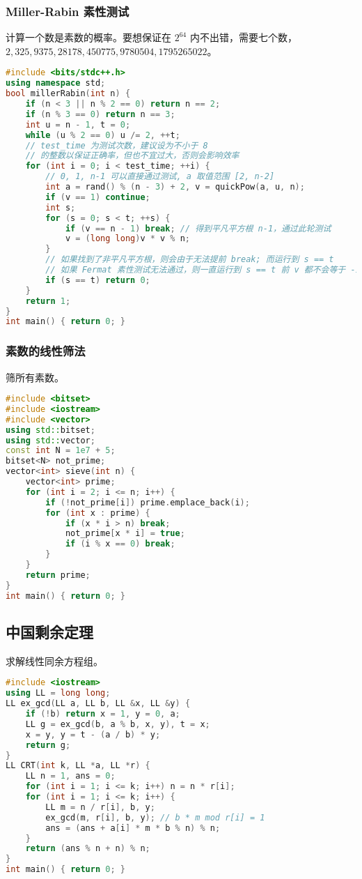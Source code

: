 \documentclass[9pt, a4paper, oneside]{book}
\begin{document}
\subsubsection{Miller-Rabin 素性测试}
计算一个数是素数的概率。要想保证在 $2^64$ 内不出错，需要七个数，$2,325,9375,28178,450775,9780504,1795265022$。
\begin{lstlisting}[language={C++}]
#include <bits/stdc++.h>
using namespace std;
bool millerRabin(int n) {
    if (n < 3 || n % 2 == 0) return n == 2;
    if (n % 3 == 0) return n == 3;
    int u = n - 1, t = 0;
    while (u % 2 == 0) u /= 2, ++t;
    // test_time 为测试次数，建议设为不小于 8
    // 的整数以保证正确率，但也不宜过大，否则会影响效率
    for (int i = 0; i < test_time; ++i) {
        // 0, 1, n-1 可以直接通过测试, a 取值范围 [2, n-2]
        int a = rand() % (n - 3) + 2, v = quickPow(a, u, n);
        if (v == 1) continue;
        int s;
        for (s = 0; s < t; ++s) {
            if (v == n - 1) break; // 得到平凡平方根 n-1，通过此轮测试
            v = (long long)v * v % n;
        }
        // 如果找到了非平凡平方根，则会由于无法提前 break; 而运行到 s == t
        // 如果 Fermat 素性测试无法通过，则一直运行到 s == t 前 v 都不会等于 -1
        if (s == t) return 0;
    }
    return 1;
}
int main() { return 0; }\end{lstlisting}
\subsubsection{素数的线性筛法}
筛所有素数。
\begin{lstlisting}[language={C++}]
#include <bitset>
#include <iostream>
#include <vector>
using std::bitset;
using std::vector;
const int N = 1e7 + 5;
bitset<N> not_prime;
vector<int> sieve(int n) {
    vector<int> prime;
    for (int i = 2; i <= n; i++) {
        if (!not_prime[i]) prime.emplace_back(i);
        for (int x : prime) {
            if (x * i > n) break;
            not_prime[x * i] = true;
            if (i % x == 0) break;
        }
    }
    return prime;
}
int main() { return 0; }\end{lstlisting}
\subsection{中国剩余定理}
求解线性同余方程组。
\begin{lstlisting}[language={C++}]
#include <iostream>
using LL = long long;
LL ex_gcd(LL a, LL b, LL &x, LL &y) {
    if (!b) return x = 1, y = 0, a;
    LL g = ex_gcd(b, a % b, x, y), t = x;
    x = y, y = t - (a / b) * y;
    return g;
}
LL CRT(int k, LL *a, LL *r) {
    LL n = 1, ans = 0;
    for (int i = 1; i <= k; i++) n = n * r[i];
    for (int i = 1; i <= k; i++) {
        LL m = n / r[i], b, y;
        ex_gcd(m, r[i], b, y); // b * m mod r[i] = 1
        ans = (ans + a[i] * m * b % n) % n;
    }
    return (ans % n + n) % n;
}
int main() { return 0; }\end{lstlisting}
\end{document}
